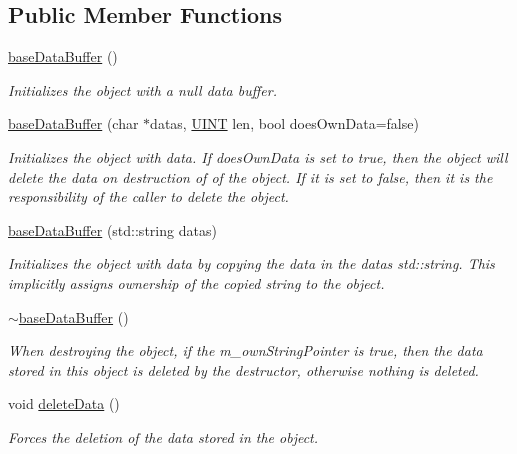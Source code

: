 \subsection*{Public Member Functions}
\begin{DoxyCompactItemize}
\item 
\hyperlink{class_communication_1_1base_data_buffer_a9dc1436f9fe7c913f224b2f80d94ee8b}{base\+Data\+Buffer} ()
\begin{DoxyCompactList}\small\item\em Initializes the object with a null data buffer. \end{DoxyCompactList}\item 
\hyperlink{class_communication_1_1base_data_buffer_a4db320396307d4c96728ec04b72fd1a1}{base\+Data\+Buffer} (char $\ast$datas, \hyperlink{typedefs_8h_a2e2c38961834f28c06e17e074eb00bc7}{U\+I\+N\+T} len, bool does\+Own\+Data=false)
\begin{DoxyCompactList}\small\item\em Initializes the object with data. If does\+Own\+Data is set to true, then the object will delete the data on destruction of of the object. If it is set to false, then it is the responsibility of the caller to delete the object. \end{DoxyCompactList}\item 
\hyperlink{class_communication_1_1base_data_buffer_a3538180b7bdfe4c6ede28b46e9299428}{base\+Data\+Buffer} (std\+::string datas)
\begin{DoxyCompactList}\small\item\em Initializes the object with data by copying the data in the datas std\+::string. This implicitly assigns ownership of the copied string to the object. \end{DoxyCompactList}\item 
\hyperlink{class_communication_1_1base_data_buffer_a87bf29aa5ff79d038eb26360228c3b00}{$\sim$base\+Data\+Buffer} ()
\begin{DoxyCompactList}\small\item\em When destroying the object, if the m\+\_\+own\+String\+Pointer is true, then the data stored in this object is deleted by the destructor, otherwise nothing is deleted. \end{DoxyCompactList}\item 
void \hyperlink{class_communication_1_1base_data_buffer_ab4a20cb0dd63824d87e71594d8797c2e}{delete\+Data} ()
\begin{DoxyCompactList}\small\item\em Forces the deletion of the data stored in the object. \end{DoxyCompactList}\item 

\end{DoxyCompactItemize}
